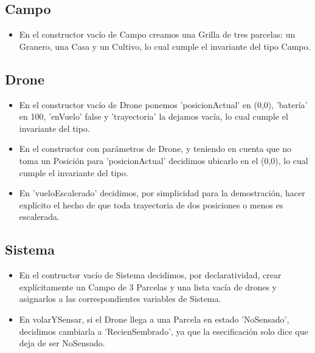 \subsection{Campo}

\begin{itemize}
\item{En el constructor vac\'io de Campo creamos una Grilla de tres parcelas:
un Granero,
una Casa y un Cultivo, lo cual cumple el invariante del tipo Campo.}
	
	
\end{itemize}
 
\subsection{Drone}
 
\begin{itemize}
 
\item{En el constructor vac\'io de Drone ponemos 'posicionActual' en (0,0),
 'bater\'ia' en 100, 'enVuelo' false y 'trayectoria' la dejamos vac\'ia,
  lo cual cumple el invariante del tipo.} 

\item{En el constructor con par\'ametros de Drone, y teniendo en cuenta que no toma un Posici\'on para 'posicionActual' decidimos ubicarlo en el (0,0),
  lo cual cumple el invariante del tipo.} 
  
\item{En 'vueloEscalerado' decidimos, por simplicidad para la demostraci\'on, hacer expl\'icito el hecho de que toda trayectoria de dos posiciones o menos es escalerada.}
 
\end{itemize}


\subsection{Sistema}

\begin{itemize}

\item{En el contructor vac\'io de Sistema decidimos, por declaratividad, crear expl\'icitamente un Campo de 3 Parcelas y una lista vac\'ia de drones y asignarlos a las correspondientes variables de Sistema.}

\item{En volarYSensar, si el Drone llega a una Parcela en estado 'NoSensado', decidimos cambiarla a 'RecienSembrado', ya que la esecificaci\'on solo dice que deja de ser NoSensado. }

\end{itemize}

